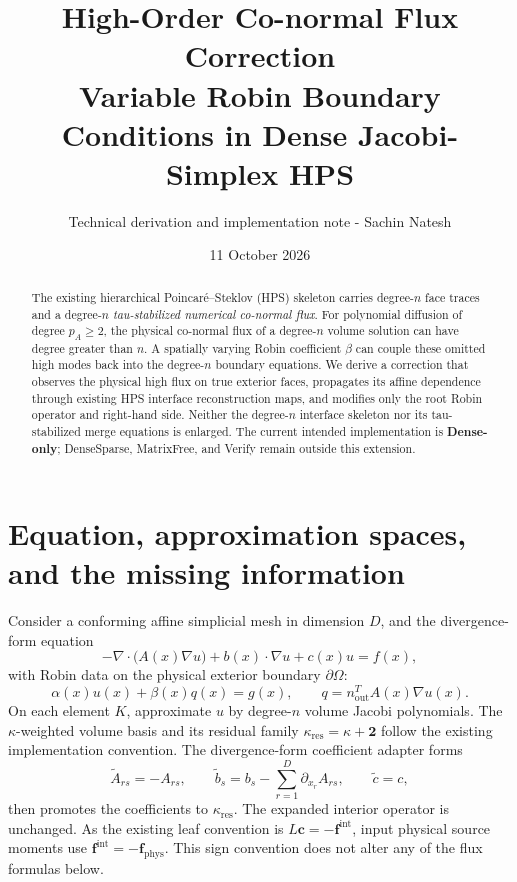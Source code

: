 \documentclass[11pt,letterpaper]{article}
\title{High-Order Co-normal Flux Correction\\[3pt]
\large Variable Robin Boundary Conditions in Dense Jacobi-Simplex HPS}
\author{Technical derivation and implementation note - Sachin Natesh}
\date{11 October 2026}
\newcommand{\fint}{\mathbf f^{\mathrm{int}}}
\newcommand{\cc}{\mathbf c}
\begin{document}
\maketitle
\vspace{-1.3em}
\begin{abstract}
The existing hierarchical Poincar\'{e}--Steklov (HPS) skeleton carries degree-\(n\) face traces and a degree-\(n\) \emph{tau-stabilized numerical co-normal flux}. For polynomial diffusion of degree \(p_A\ge2\), the physical co-normal flux of a degree-\(n\) volume solution can have degree greater than \(n\). A spatially varying Robin coefficient \(\beta\) can couple these omitted high modes back into the degree-\(n\) boundary equations. We derive a correction that observes the physical high flux on true exterior faces, propagates its affine dependence through existing HPS interface reconstruction maps, and modifies only the root Robin operator and right-hand side. Neither the degree-\(n\) interface skeleton nor its tau-stabilized merge equations is enlarged. The current intended implementation is \textbf{Dense-only}; DenseSparse, MatrixFree, and Verify remain outside this extension.
\end{abstract}

\section{Equation, approximation spaces, and the missing information}
Consider a conforming affine simplicial mesh in dimension \(D\), and the divergence-form equation
\begin{equation}\label{eq:pde}
 -\nabla\!\cdot\!\bigl(A(x)\nabla u\bigr)+b(x)\cdot\nabla u+c(x)u=f(x),
\end{equation}
with Robin data on the physical exterior boundary \(\partial\Omega\):
\begin{equation}\label{eq:robin}
 \alpha(x)u(x)+\beta(x)q(x)=g(x),\qquad
 q=n_{\mathrm{out}}^{T}A(x)\nabla u(x).
\end{equation}
On each element \(K\), approximate \(u\) by degree-\(n\) volume Jacobi polynomials. The \(\kappa\)-weighted volume basis and its residual family \(\kappa_{\mathrm{res}}=\kappa+\mathbf 2\) follow the existing implementation convention. The divergence-form coefficient adapter forms
\begin{equation}\label{eq:expanded}
 \widetilde A_{rs}=-A_{rs},\qquad
 \widetilde b_s=b_s-\sum_{r=1}^{D}\partial_{x_r}A_{rs},\qquad
 \widetilde c=c,
\end{equation}
then promotes the coefficients to \(\kappa_{\mathrm{res}}\). The expanded interior operator is unchanged. As the existing leaf convention is \(L\cc=-\fint\), input physical source moments use \(\fint=-\mathbf f_{\mathrm{phys}}\). This sign convention does not alter any of the flux formulas below.
\end{document}
